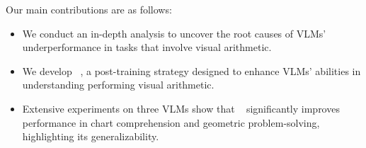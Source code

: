 Our main contributions are as follows:
\begin{itemize}[leftmargin=*]\itemsep0em 
    \item We conduct an in-depth analysis to uncover the root causes of VLMs' underperformance in tasks that involve visual arithmetic. 
    \item We develop \method~, a post-training strategy designed to enhance VLMs' abilities in understanding performing visual arithmetic.
    \item Extensive experiments on three VLMs show that \method~ significantly improves performance in chart comprehension and geometric problem-solving, highlighting its generalizability.
\end{itemize}








